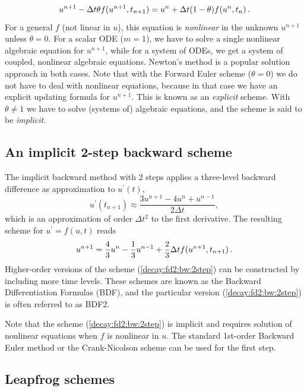 \documentclass[%
oneside,                 %
final,                   %
10pt]{article}
\begin{document}
\begin{equation}
u^{n+1} - \Delta t \theta f(u^{n+1},t_{n+1}) =
u^n + \Delta t(1-\theta)f(u^n, t_n)\thinspace .
\end{equation}
For a general $f$ (not linear in $u$), this equation is \emph{nonlinear} in
the unknown $u^{n+1}$ unless $\theta = 0$. For a scalar ODE ($m=1$),
we have to solve a single nonlinear algebraic equation for $u^{n+1}$,
while for a system of ODEs, we get a system of coupled, nonlinear
algebraic equations. Newton's method is a popular solution approach
in both cases. Note that with the Forward Euler scheme ($\theta =0$)
we do not have to deal with nonlinear equations, because in that
case we have an explicit updating formula for $u^{n+1}$. This is known
as an \emph{explicit} scheme. With $\theta\neq 1$ we have to solve
(systems of) algebraic equations, and the scheme is said to be \emph{implicit}.

\subsection{An implicit 2-step backward scheme}

 

The implicit backward method with 2 steps applies a
three-level backward difference as approximation to $u^{\prime}(t)$,
\[ u^{\prime}(t_{n+1}) \approx \frac{3u^{n+1} - 4u^{n} + u^{n-1}}{2\Delta t},\]
which is an approximation of order $\Delta t^2$ to the first derivative.
The resulting scheme for $u^{\prime}=f(u,t)$ reads
\begin{equation}
u^{n+1} = \frac{4}{3}u^n - \frac{1}{3}u^{n-1} +
\frac{2}{3}\Delta t f(u^{n+1}, t_{n+1})
\thinspace .
\label{decay:fd2:bw:2step}
\end{equation}
Higher-order versions of the scheme (\ref{decay:fd2:bw:2step}) can
be constructed by including more time levels. These schemes are known
as the Backward Differentiation Formulas (BDF), and the particular
version (\ref{decay:fd2:bw:2step}) is often referred to as BDF2.

Note that the scheme (\ref{decay:fd2:bw:2step}) is implicit and requires
solution of nonlinear equations when $f$ is nonlinear in $u$.  The
standard 1st-order Backward Euler method or the Crank-Nicolson scheme
can be used for the first step.


\subsection{Leapfrog schemes}
\end{document}
